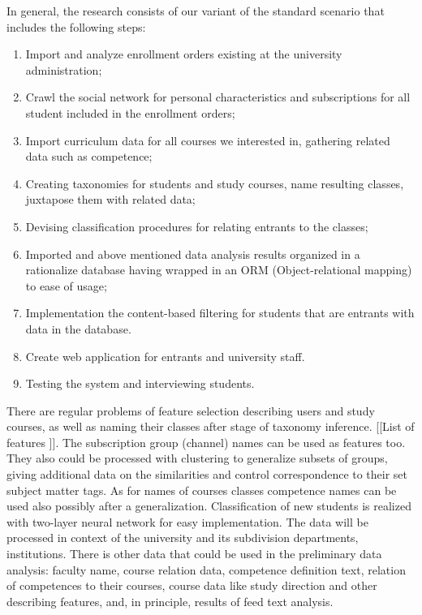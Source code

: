 \documentclass[conference]{IEEEtran}
\begin{document}
In general, the research consists of our variant of the standard scenario that includes the following steps:
\begin{enumerate}
\item Import and analyze enrollment orders existing at the university administration;
\item Crawl the social network for personal characteristics and subscriptions for all student included in the enrollment orders;
\item Import curriculum data for all courses we interested in, gathering related data such as competence;
\item Creating taxonomies for students and study courses, name resulting classes, juxtapose them with related data;
\item Devising classification procedures for relating entrants to the classes;
\item Imported and above mentioned data analysis results organized in a rationalize database having wrapped in an ORM (Object-relational mapping) to ease of usage;
\item Implementation the content-based filtering for students that are entrants with data in the database.
\item Create web application for entrants and university staff.
\item Testing the system and interviewing students.
\end{enumerate}

There are regular problems of feature selection describing users and study courses, as well as naming their classes after stage of taxonomy inference. [[List of features ]].  The subscription group (channel) names can be used as features too.  They also could be processed with clustering to generalize subsets of groups, giving additional data on the similarities and control correspondence to their set subject matter tags.  As for names of courses classes competence names can be used also possibly after a generalization.  Classification of new students is realized with two-layer neural network for easy implementation. The data will be processed in context of the university and its subdivision departments, institutions.  There is other data that could be used in the preliminary data analysis: faculty name, course relation data, competence definition text, relation of competences to their courses, course data like study direction and other describing features, and, in principle, results of feed text analysis.
\end{document}
